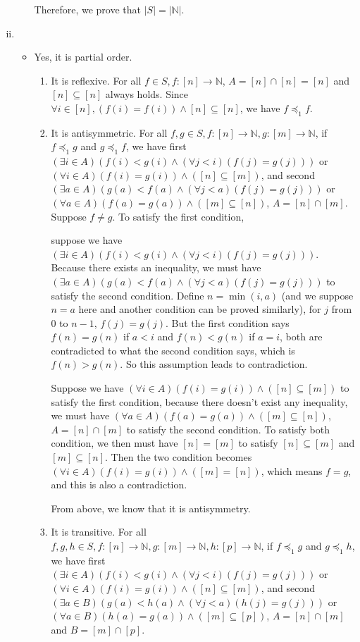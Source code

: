 \documentclass{article}[12pt]
\begin{document}
\begin{enumerate}[(i)]
\begin{itemize}
Therefore, we prove that $|S|=|\mathbb{N}|$.
\end{itemize}
\item \begin{itemize}
\item Yes, it is partial order.
\begin{enumerate}
\item It is reflexive. For all $f\in S, f:[n]\rightarrow \mathbb{N}$, $A=[n]\cap [n]=[n]$ and $[n]\subseteq [n]$ always holds. Since $\forall i\in [n], (f(i)=f(i))\wedge [n]\subseteq [n]$, we have $f\preceq_1 f$.
\item It is antisymmetric. For all $f,g\in S, f:[n]\rightarrow \mathbb{N},g:[m]\rightarrow \mathbb{N}$, if $f\preceq_1 g$ and $g\preceq_1 f$, we have first $(\exists i \in A)(f(i)<g(i) \wedge(\forall j<i)(f(j)=g(j)))$ or $(\forall i \in A)(f(i)=g(i)) \wedge([n] \subseteq[m])$, and second $(\exists a \in A)(g(a)<f(a) \wedge(\forall j<a)(f(j)=g(j)))$ or $(\forall a \in A)(f(a)=g(a)) \wedge([m] \subseteq[n])$, $A=[n]\cap [m]$. Suppose $f\not=g$.
To satisfy the first condition, \par 
suppose we have $(\exists i \in A)(f(i)<g(i) \wedge(\forall j<i)(f(j)=g(j)))$. 
Because there exists an inequality, we must have $(\exists a \in A)(g(a)<f(a) \wedge(\forall j<a)(f(j)=g(j)))$ to satisfy the second condition. Define $n=\min(i,a)$ (and we suppose $n=a$ here and another condition can be proved similarly), for $j$ from 0 to $n-1$, $f(j)=g(j) $. But the first condition says $f(n)=g(n)$ if $a<i$ and $f(n)<g(n)$ if $a=i$, both are contradicted to what the second condition says, which is $f(n)>g(n)$. So this assumption leads to contradiction.\par
Suppose we have $(\forall i \in A)(f(i)=g(i)) \wedge([n] \subseteq[m])$ to satisfy the first condition, because there doesn't exist any inequality, we must have $(\forall a \in A)(f(a)=g(a)) \wedge([m] \subseteq[n])$, $A=[n]\cap [m]$ to satisfy the second condition. To satisfy both condition, we then must have $[n]=[m]$ to satisfy $[n] \subseteq[m]$ and $[m] \subseteq[n]$. Then the two condition becomes $(\forall i \in A)(f(i)=g(i)) \wedge([m] =[n])$, which means $f=g$, and this is also a contradiction.\par 
From above, we know that it is antisymmetry.
\item It is transitive. For all $f,g,h\in S, f:[n]\rightarrow \mathbb{N},g:[m]\rightarrow \mathbb{N}, h:[p]\rightarrow \mathbb{N}$, if $f\preceq_1 g$ and $g\preceq_1 h$, we have first $(\exists i \in A)(f(i)<g(i) \wedge(\forall j<i)(f(j)=g(j)))$ or $(\forall i \in A)(f(i)=g(i)) \wedge([n] \subseteq[m])$, and second $(\exists a \in B)(g(a)<h(a) \wedge(\forall j<a)(h(j)=g(j)))$ or $(\forall a \in B)(h(a)=g(a)) \wedge([m] \subseteq[p])$, $A=[n]\cap [m]$ and $B=[m]\cap [p]$. 

\end{enumerate}
\end{itemize}
\end{enumerate}
\end{document}
